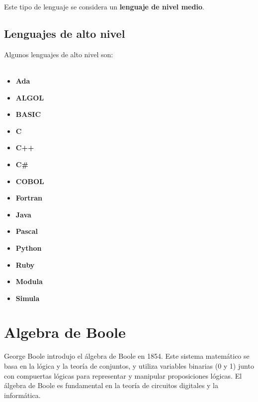 \documentclass{templateNote}
\begin{document}
\vspace{1cm} %

\noindent Este tipo de lenguaje se considera un \textbf{lenguaje de nivel medio}.\\

\subsection{Lenguajes de alto nivel}
\noindent Algunos lenguajes de alto nivel son: \\\\
\begin{minipage}{0.33\textwidth}
\begin{itemize}
    \item \textbf{Ada}
    \item \textbf{ALGOL}
    \item \textbf{BASIC}
    \item \textbf{C}
    \item \textbf{C++}
\end{itemize}
\end{minipage}
\begin{minipage}{0.33\textwidth}
\begin{itemize}
    \item \textbf{C\#}
    \item \textbf{COBOL}
    \item \textbf{Fortran}
    \item \textbf{Java}
    \item \textbf{Pascal}
\end{itemize}
\end{minipage}
\begin{minipage}{0.33\textwidth}
\begin{itemize}
    \item \textbf{Python}
    \item \textbf{Ruby}
    \item \textbf{Modula}
    \item \textbf{Simula}
\end{itemize}
\end{minipage}
\newpage

\section{Algebra de Boole}
\noindent George Boole introdujo el álgebra de Boole en 1854. Este sistema matemático se basa en la lógica y la teoría de conjuntos, y utiliza variables binarias (0 y 1) junto con compuertas lógicas para representar y manipular proposiciones lógicas. El álgebra de Boole es fundamental en la teoría de circuitos digitales y la informática.
\end{document}
